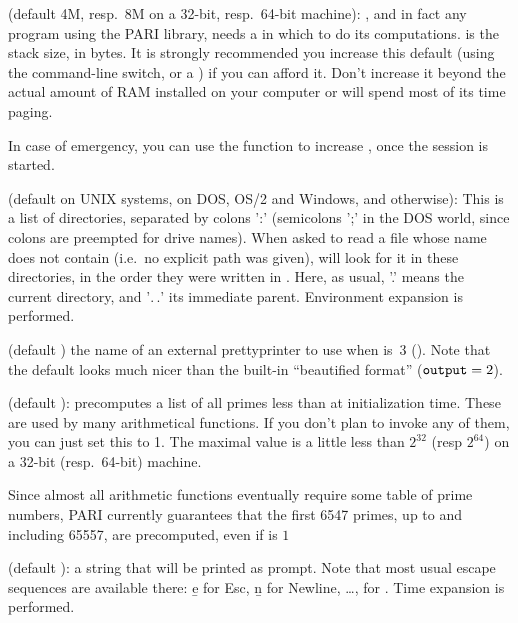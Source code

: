 \label{se:parisize} (default 4M, resp.~8M on a 32-bit,
resp.~64-bit machine): , and in fact any program using the PARI
library, needs a  in which to do its computations. 
is the stack size, in bytes. It is strongly recommended you increase this
default (using the  command-line switch, or a ) if you can
afford it. Don't increase it beyond the actual amount of RAM installed on
your computer or  will spend most of its time paging.

In case of emergency, you can use the  function to
increase , once the session is started.

 (default  on UNIX systems,
 on DOS, OS/2 and Windows, and  otherwise):
This is a list of directories, separated by colons ':' (semicolons ';' in the
DOS world, since colons are preempted for drive names). When asked to read a
file whose name does not contain \kbd{/} (i.e.~no explicit path was given),
 will look for it in these directories, in the order they were written in
. Here, as usual, '.' means the current directory, and '$.\,.$' its
immediate parent. Environment expansion is performed.

 (default ) the name of an external prettyprinter to use when
 is~3 (). Note that the default
 looks much nicer than the built-in ``beautified
format'' (${\tt output} = 2$).

 (default ):  precomputes a list of
all primes less than  at initialization time. These are used
by many arithmetical functions. If you don't plan to invoke any of them, you
can just set this to 1. The maximal value is a little less than $2^32$
(resp $2^64$) on a 32-bit (resp.~64-bit) machine.

Since almost all arithmetic functions eventually require some table of prime
numbers, PARI currently guarantees that the first 6547 primes, up to and
including 65557, are precomputed, even if  is $1$

 (default ): a string that will be printed as
prompt. Note that most usual escape sequences are available there: \b{e} for
Esc, \b{n} for Newline, \dots, \kbd{\bs\bs} for \kbd{\bs}. Time expansion is
performed.

